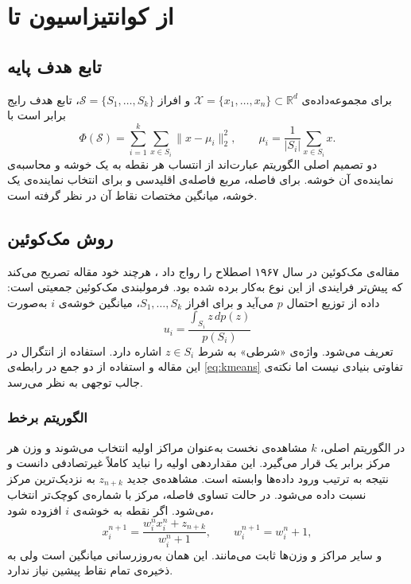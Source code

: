 \chapter{از کوانتیزاسیون تا }

\section{تابع هدف پایه}

برای مجموعه‌داده‌ی $\mathcal{X}=\{x_1,\ldots,x_n\}\subset\mathbb{R}^d$ و
افراز $\mathcal{S}=\{S_1,\ldots,S_k\}$، تابع هدف رایج  برابر است با
\begin{equation}
    \Phi(\mathcal{S})=\sum_{i=1}^{k}\sum_{x\in S_i}\lVert x-\mu_i\rVert_2^2,
    \qquad
    \mu_i=\frac{1}{|S_i|}\sum_{x\in S_i}x.
    \label{eq:kmeans}
\end{equation}
دو تصمیم اصلی الگوریتم عبارت‌اند از انتساب هر نقطه به یک خوشه و محاسبه‌ی
نماینده‌ی آن خوشه. برای فاصله، مربع فاصله‌ی اقلیدسی و برای انتخاب نماینده‌ی یک
خوشه، میانگین مختصات نقاط آن در نظر گرفته است.

\section{روش مک‌کوئین}

مقاله‌ی مک‌کوئین در سال ۱۹۶۷ اصطلاح  را رواج داد
\cite{macqueen1967}، هرچند خود مقاله تصریح می‌کند که پیش‌تر فرایندی
از این نوع  به‌کار برده شده بود. فرمولبندی مک‌کوئین جمعیتی است: داده از توزیع
احتمال $p$ می‌آید و برای افراز $S_1,\ldots,S_k$، میانگین  خوشه‌ی $i$
به‌صورت
\begin{equation}
    u_i=\frac{\int_{S_i}z\,dp(z)}{p(S_i)}
\end{equation}
تعریف می‌شود. واژه‌ی «شرطی» به شرط $z\in S_i$ اشاره دارد. استفاده از انتگرال
در این مقاله و استفاده از دو جمع در رابطه‌ی \ref{eq:kmeans} تفاوتی بنیادی نیست اما نکته‌ی جالب توجهی به نظر می‌رسد.

\subsection{الگوریتم برخط}

در الگوریتم اصلی، $k$ مشاهده‌ی نخست به‌عنوان مراکز اولیه انتخاب می‌شوند و
وزن هر مرکز برابر یک قرار می‌گیرد. این مقداردهی اولیه را نباید کاملاً غیرتصادفی دانست و نتیجه به ترتیب
ورود داده‌ها وابسته است. مشاهده‌ی جدید $z_{n+k}$ به نزدیک‌ترین مرکز نسبت
داده می‌شود. در حالت تساوی فاصله، مرکز با شماره‌ی کوچک‌تر انتخاب می‌شود.
اگر نقطه به خوشه‌ی $i$ افزوده شود،
\begin{equation}
    x_i^{n+1}=
    \frac{w_i^n x_i^n+z_{n+k}}{w_i^n+1},
    \qquad
    w_i^{n+1}=w_i^n+1,
    \label{eq:macqueen-update}
\end{equation}
و سایر مراکز و وزن‌ها ثابت می‌مانند. این همان به‌روزرسانی میانگین
است ولی به ذخیره‌ی تمام نقاط پیشین نیاز ندارد.


